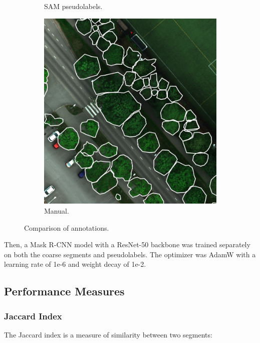 \documentclass[english, 12pt, a4paper, sci, utf8, a-2b, online]{aaltothesis}
\begin{document}
\begin{figure}[h]
\begin{subfigure}[b]{0.32\textwidth}
        \caption{SAM pseudolabels.}
    \end{subfigure}
    \begin{subfigure}[b]{0.32\textwidth}
        \includegraphics[width=1.0\textwidth]{figures/annotations/manual.png}
        \caption{Manual.}
    \end{subfigure}
    \caption{Comparison of annotations.}
    \label{fig:annotation-comparison}
\end{figure}

Then, a Mask R-CNN model with a ResNet-50 \cite{resnet} backbone was trained separately on both the coarse segments and pseudolabels. The optimizer was AdamW \cite{adamw} with a learning rate of 1e-6 and weight decay of 1e-2.

\newpage


\subsection{Performance Measures}

\subsubsection{Jaccard Index}

The Jaccard index\cite{jaccard} is a measure of similarity between two segments:
\end{document}
